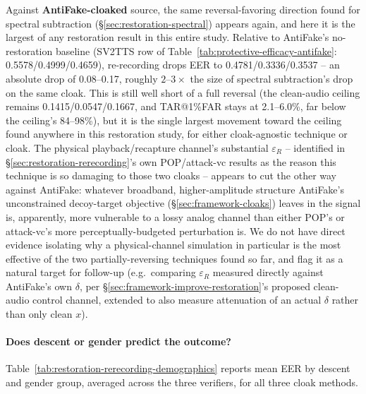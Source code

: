 \documentclass[11pt]{article}
\begin{document}
Against \textbf{AntiFake-cloaked} source, the same reversal-favoring
direction found for spectral subtraction
(\S\ref{sec:restoration-spectral}) appears again, and here it is the
largest of any restoration result in this entire study. Relative to
AntiFake's no-restoration baseline (SV2TTS row of
Table~\ref{tab:protective-efficacy-antifake}: 0.5578/0.4999/0.4659),
re-recording drops EER to 0.4781/0.3336/0.3537 -- an absolute drop of
0.08--0.17, roughly $2$--$3\times$ the size of spectral subtraction's
drop on the same cloak. This is still well short of a full reversal
(the clean-audio ceiling remains 0.1415/0.0547/0.1667, and TAR@1\%FAR
stays at 2.1--6.0\%, far below the ceiling's 84--98\%), but it is the
single largest movement toward the ceiling found anywhere in this
restoration study, for either cloak-agnostic technique or cloak. The
physical playback/recapture channel's substantial $\varepsilon_R$ --
identified in \S\ref{sec:restoration-rerecording}'s own POP/attack-vc
results as the reason this technique is so damaging to those two cloaks
-- appears to cut the other way against AntiFake: whatever broadband,
higher-amplitude structure AntiFake's unconstrained decoy-target
objective (\S\ref{sec:framework-cloaks}) leaves in the signal is,
apparently, more vulnerable to a lossy analog channel than either
POP's or attack-vc's more perceptually-budgeted perturbation is. We do
not have direct evidence isolating why a physical-channel simulation in
particular is the most effective of the two partially-reversing
techniques found so far, and flag it as a natural target for follow-up
(e.g.\ comparing $\varepsilon_R$ measured directly against AntiFake's
own $\delta$, per \S\ref{sec:framework-improve-restoration}'s proposed
clean-audio control channel, extended to also measure attenuation of an
actual $\delta$ rather than only clean $x$).

\paragraph{Does descent or gender predict the outcome?}
Table~\ref{tab:restoration-rerecording-demographics} reports mean EER
by descent and gender group, averaged across the three verifiers, for
all three cloak methods.
\end{document}
